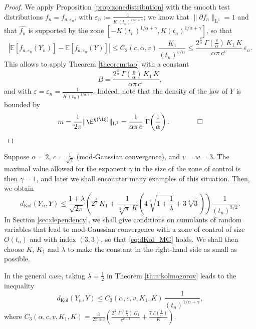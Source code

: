 \documentclass[envcountsame]{svmult}
\newcommand{\esper}{\mathbb{E}}
\newcommand{\leb}{\mathrm{L}}
\newcommand{\dkol}{d_\mathrm{Kol}}
\newcommand{\eps}{\varepsilon}
\begin{document}
\begin{proof}
We apply Proposition \ref{prop:zonedistribution} with the smooth test distributions $f_n=f_{a,\eps_n}$,
with $\eps_n:=\tfrac{1}{K\,(t_n)^{1/\alpha+\gamma}}$;
we know that $\|\partial f_n\|_{\leb^1}=1$ and that
$\widehat{f_n}$ is supported by the zone $[-K(t_n)^{1/\alpha+\gamma},K(t_n)^{1/\alpha+\gamma}]$, so that
\begin{equation*}
\left|\esper[f_{a,\eps_n}(Y_n)]-\esper[f_{a,\eps_n}(Y)]\right|\leq C_2(c,\alpha,v)\,\frac{K_1}{(t_n)^{v/\alpha}} \leq \frac{2^\frac{v}{\alpha}\,\Gamma(\frac{v}{\alpha})\,K_1\,K}{\alpha\pi\,c^v}\,\eps_n.
\end{equation*}
This allows to apply Theorem \ref{theorem:tao} with a constant 
$$B = \frac{2^\frac{v}{\alpha}\,\Gamma(\frac{v}{\alpha})\,K_1\,K}{\alpha\pi\,c^v},$$ and with $\eps=\eps_n = \tfrac{1}{K\,(t_n)^{1/\alpha+\gamma}}$. Indeed, note that the density of the law of $Y$ is bounded by 
\begin{equation*}
m=\frac{1}{2\pi}\|\E^{\eta(\I\xi)}\|_{\leb^1}=\frac{1}{\alpha\pi\,c}\,\,\Gamma\!\left(\frac{1}{\alpha}\right).\qquad\qed
\end{equation*}
\end{proof}
\begin{remark}
Suppose $\alpha=2$, $c = \frac{1}{\sqrt{2}}$ (mod-Gaussian convergence), and $v=w=3$. The maximal value allowed for the exponent $\gamma$ in the size of the zone of control is then $\gamma = 1$, and later we shall encounter many examples of this situation. Then, we obtain
\begin{equation}
  \dkol(Y_n,Y) \leq \frac{1+\lambda}{\sqrt{2 \pi}}\left(2^\frac{3}{2}\,K_1 + \frac{1}{\sqrt[3]{\pi}\,K }\left(4\sqrt[3]{1+\frac{1}{\lambda}}+3\sqrt[3]{3}\right)\right)\frac{1}{(t_n)^{3/2}}.
  \label{eq:dKol_MG}
\end{equation}
In Section \ref{sec:dependency}, we shall give conditions on cumulants of random variables that lead to mod-Gaussian convergence with a zone of control of size $O(t_n)$ and with index $(3,3)$, so that \eqref{eq:dKol_MG} holds.
We shall then choose $K$, $K_1$ and $\lambda$ to make the constant in the right-hand side as small as possible.
\end{remark}
\begin{remark}
In the general case, taking $\lambda=\frac{1}{2}$ in Theorem \ref{thm:kolmogorov} leads to the inequality
$$\dkol(Y_n,Y) \leq C_3(\alpha,c,v,K_1,K)\,\frac{1}{(t_n)^{1/\alpha +\gamma}},$$
where $C_3(\alpha,c,v,K_1,K) = \frac{3}{2\pi\,\alpha\,c}\left(\frac{2^{\frac{v}{\alpha}}\,\Gamma(\frac{v}{\alpha})\,K_1}{c^{v-1}}+\frac{7\,\Gamma(\frac{1}{\alpha})}{K}\right)$. 
\end{remark}
\end{document}
